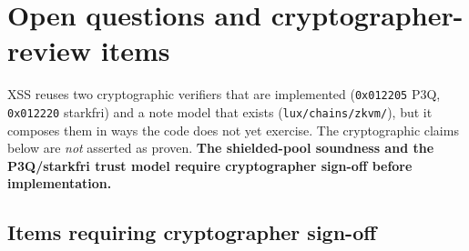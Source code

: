 \section{Open questions and cryptographer-review items}
\label{sec:open}

XSS reuses two cryptographic verifiers that are implemented
(\texttt{0x012205} P3Q, \texttt{0x012220} starkfri) and a note model that
exists (\texttt{lux/chains/zkvm/}), but it composes them in ways the code
does not yet exercise. The cryptographic claims below are \emph{not}
asserted as proven. \textbf{The shielded-pool soundness and the
P3Q/starkfri trust model require cryptographer sign-off before
implementation.}

\subsection{Items requiring cryptographer sign-off}

